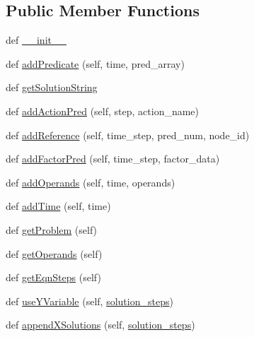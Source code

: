 \subsection*{Public Member Functions}
\begin{DoxyCompactItemize}
\item 
def \hyperlink{classeqn__viz_1_1_math_problem_parser_a2a21411a119d6a44fd67d010f452765d}{\+\_\+\+\_\+init\+\_\+\+\_\+}
\item 
def \hyperlink{classeqn__viz_1_1_math_problem_parser_a427749aff431b9838949ce868dd81621}{add\+Predicate} (self, time, pred\+\_\+array)
\item 
def \hyperlink{classeqn__viz_1_1_math_problem_parser_a127c28e9a12bbc78838891b2bbe85ef4}{get\+Solution\+String}
\item 
def \hyperlink{classeqn__viz_1_1_math_problem_parser_ae163bcbeaacca8c7e47af8d1a15fde8c}{add\+Action\+Pred} (self, step, action\+\_\+name)
\item 
def \hyperlink{classeqn__viz_1_1_math_problem_parser_ad7c8469e93c4c2f620f30d663f563c4b}{add\+Reference} (self, time\+\_\+step, pred\+\_\+num, node\+\_\+id)
\item 
def \hyperlink{classeqn__viz_1_1_math_problem_parser_ab05994e7b9a83931e5e0802b2c724261}{add\+Factor\+Pred} (self, time\+\_\+step, factor\+\_\+data)
\item 
def \hyperlink{classeqn__viz_1_1_math_problem_parser_ad1f35b057ba94c414bf18ff3eb414202}{add\+Operands} (self, time, operands)
\item 
def \hyperlink{classeqn__viz_1_1_math_problem_parser_a0e36a14a794a3612141dde4ddce4050d}{add\+Time} (self, time)
\item 
def \hyperlink{classeqn__viz_1_1_math_problem_parser_a71da891f047cb55a65759b22343f33e2}{get\+Problem} (self)
\item 
def \hyperlink{classeqn__viz_1_1_math_problem_parser_af59f19417ba8a05ef152b41e34c208eb}{get\+Operands} (self)
\item 
def \hyperlink{classeqn__viz_1_1_math_problem_parser_acaa8d2253504d12ee95cd79070289551}{get\+Eqn\+Steps} (self)
\item 
def \hyperlink{classeqn__viz_1_1_math_problem_parser_a4a4f4a6aa62b717dc159ec39ce25c35f}{use\+Y\+Variable} (self, \hyperlink{classeqn__viz_1_1_math_problem_parser_aa35a182df8bfc89e74a840e370e089f2}{solution\+\_\+steps})
\item 
def \hyperlink{classeqn__viz_1_1_math_problem_parser_adc7dee767cc96c729f3172cc399955a5}{append\+X\+Solutions} (self, \hyperlink{classeqn__viz_1_1_math_problem_parser_aa35a182df8bfc89e74a840e370e089f2}{solution\+\_\+steps})

\end{DoxyCompactItemize}
